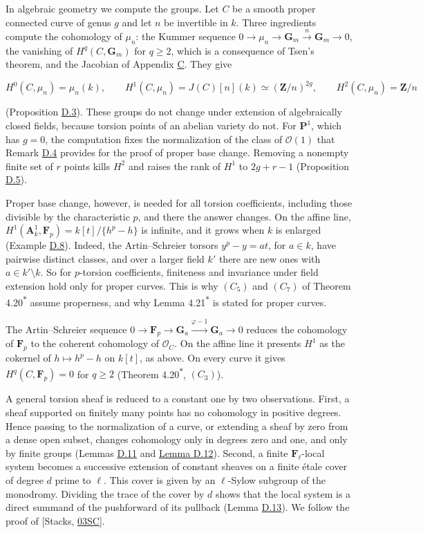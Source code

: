 \documentclass[11pt]{article}
\newcommand{\bpout}[1]{#1\textsuperscript{\hyperlink{bp-outside}{\ensuremath{\ast}}}}
\begin{document}
In algebraic geometry we compute the groups. Let \(C\) be a smooth proper connected curve of genus \(g\) and let \(n\) be invertible in \(k\). Three ingredients compute the cohomology of \(\mu_n\): the Kummer sequence \(0\to\mu_n\to\mathbf G_m\xrightarrow{n}\mathbf G_m\to0\), the vanishing of \(H^q(C,\mathbf G_m)\) for \(q\geq2\), which is a consequence of Tsen's theorem, and the Jacobian of Appendix \hyperref[bp119]{C}. They give

\[
H^0(C,\mu_n)=\mu_n(k),\qquad H^1(C,\mu_n)=J(C)[n](k)\simeq(\mathbf Z/n)^{2g},
\qquad H^2(C,\mu_n)=\mathbf Z/n
\]

(Proposition \hyperref[bp181]{D.3}). These groups do not change under extension of algebraically closed fields, because torsion points of an abelian variety do not. For \(\mathbf P^1\), which has \(g=0\), the computation fixes the normalization of the class of \(\mathcal O(1)\) that Remark \hyperref[bp183]{D.4} provides for the proof of proper base change. Removing a nonempty finite set of \(r\) points kills \(H^2\) and raises the rank of \(H^1\) to \(2g+r-1\) (Proposition \hyperref[bp186]{D.5}).

Proper base change, however, is needed for all torsion coefficients, including those divisible by the characteristic \(p\), and there the answer changes. On the affine line, \(H^1(\mathbf A^1_k,\mathbf F_p)=k[t]/\{h^p-h\}\) is infinite, and it grows when \(k\) is enlarged (Example \hyperref[bp197]{D.8}). Indeed, the Artin–Schreier torsors \(y^p-y=at\), for \(a\in k\), have pairwise distinct classes, and over a larger field \(k'\) there are new ones with \(a\in k'\setminus k\). So for \(p\)-torsion coefficients, finiteness and invariance under field extension hold only for proper curves. This is why \((C_5)\) and \((C_7)\) of Theorem \bpout{4.20} assume properness, and why Lemma \bpout{4.21} is stated for proper curves.

The Artin–Schreier sequence \(0\to\mathbf F_p\to\mathbf G_a\xrightarrow{\varphi-1}\mathbf G_a\to0\) reduces the cohomology of \(\mathbf F_p\) to the coherent cohomology of \(\mathcal O_C\). On the affine line it presents \(H^1\) as the cokernel of \(h\mapsto h^p-h\) on \(k[t]\), as above. On every curve it gives \(H^q(C,\mathbf F_p)=0\) for \(q\geq2\) (Theorem \bpout{4.20}, \((C_3)\)).

A general torsion sheaf is reduced to a constant one by two observations. First, a sheaf supported on finitely many points has no cohomology in positive degrees. Hence passing to the normalization of a curve, or extending a sheaf by zero from a dense open subset, changes cohomology only in degrees zero and one, and only by finite groups (Lemmas \hyperref[bp207]{D.11} and \hyperref[bp212]{Lemma D.12}). Second, a finite \(\mathbf F_\ell\)-local system becomes a successive extension of constant sheaves on a finite étale cover of degree \(d\) prime to \(\ell\). This cover is given by an \(\ell\)-Sylow subgroup of the monodromy. Dividing the trace of the cover by \(d\) shows that the local system is a direct summand of the pushforward of its pullback (Lemma \hyperref[bp217]{D.13}). We follow the proof of [Stacks, \href{https://stacks.math.columbia.edu/tag/03SC}{03SC}].
\end{document}
